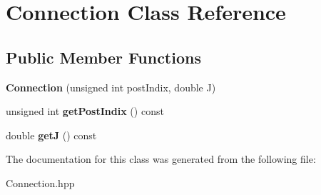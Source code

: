 \hypertarget{classConnection}{\section{Connection Class Reference}
\label{classConnection}
}
\subsection*{Public Member Functions}
\begin{DoxyCompactItemize}
\item 
\hypertarget{classConnection_aad98dc17fd7ee35478563dde5585fb19}{{\bfseries Connection} (unsigned int post\-Indix, double J)}\label{classConnection_aad98dc17fd7ee35478563dde5585fb19}

\item 
\hypertarget{classConnection_a041e01eaab7cd50006daf76c6610901a}{unsigned int {\bfseries get\-Post\-Indix} () const }\label{classConnection_a041e01eaab7cd50006daf76c6610901a}

\item 
\hypertarget{classConnection_aa11af0e88a452d27e94997a817c3de20}{double {\bfseries get\-J} () const }\label{classConnection_aa11af0e88a452d27e94997a817c3de20}

\end{DoxyCompactItemize}


The documentation for this class was generated from the following file\-:\begin{DoxyCompactItemize}
\item 
Connection.\-hpp\end{DoxyCompactItemize}

